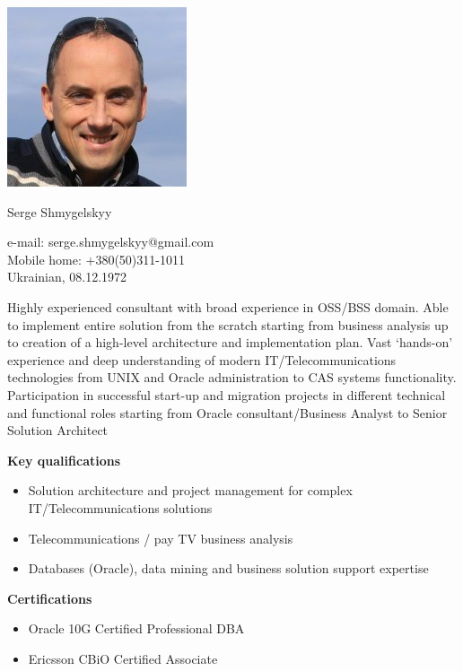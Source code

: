 \documentclass[10pt,a4paper]{extbook}
\begin{document}
 
\setlength{\parindent}{0cm}
\begin{multicols}{2}
	\includegraphics[scale=0.6]{shmyg.jpg} \\
	{\Huge \raggedright Serge Shmygelskyy \par}
	\doublespacing
	{\large \raggedright e-mail: serge.shmygelskyy@gmail.com \\
	Mobile home: +380(50)311-1011 \\
	Ukrainian, 08.12.1972 \par}
\end{multicols}
\singlespacing

\vspace{5mm}
Highly experienced consultant with broad experience in OSS/BSS domain. Able to implement entire solution from the scratch starting from business analysis up to creation of a high-level architecture and implementation plan. Vast ‘hands-on’ experience and deep understanding of modern IT/Telecommunications technologies from UNIX and Oracle administration to CAS systems functionality. Participation in successful start-up and migration projects in different technical and functional roles starting from Oracle consultant/Business Analyst to Senior Solution Architect

\vspace{5mm}
{\large \textbf {Key qualifications} \par}
\begin{itemize}[noitemsep,topsep=3mm,parsep=0pt,partopsep=0pt,itemindent=0pt,leftmargin=4mm]
\item Solution architecture and project management for complex IT/Telecommunications solutions
\item Telecommunications / pay TV business analysis
\item Databases (Oracle), data mining and business solution support expertise
\end{itemize}

{\large \textbf {Certifications}}
\begin{itemize}[noitemsep,topsep=3mm,parsep=0pt,partopsep=0pt,itemindent=0pt,leftmargin=4mm]
\item Oracle 10G Certified Professional DBA
\item Ericsson CBiO Certified Associate 
\end{itemize}
\end{document}
